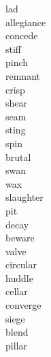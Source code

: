 \documentclass[b5paper, 11pt]{ctexart}
\begin{document}
\begin{multicols*}{3}
    \begin{description}

\item[lad]

\item[allegiance]

\item[concede]

\item[stiff]

\item[pinch]

\item[remnant]

\item[crisp]

\item[shear]

\item[seam]

\item[sting]

\item[spin]

\item[brutal]

\item[swan]

\item[wax]

\item[slaughter]

\item[pit]

\item[decay]

\item[beware]

\item[valve]

\item[circular]

\item[huddle]

\item[cellar]

\item[converge]

\item[siege]

\item[blend]

\item[pillar]


\end{description}
\end{multicols*}
\end{document}
